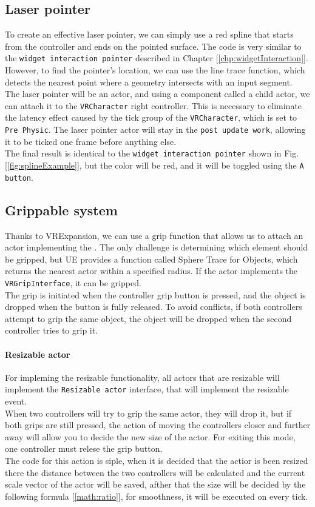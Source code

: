 \subsection{Laser pointer}
\noindent
To create an effective laser pointer, we can simply use a red spline that starts from the controller and ends on the pointed surface. The code is very similar to the \texttt{widget interaction pointer} described in Chapter [\ref{chp:widgetInteraction}]. However, to find the pointer's location, we can use the line trace function, which detects the nearest point where a geometry intersects with an input segment.\\
The laser pointer will be an actor, and using a component called a child actor, we can attach it to the \texttt{VRCharacter} right controller. This is necessary to eliminate the latency effect caused by the tick group of the \texttt{VRCharacter}, which is set to \texttt{Pre Physic}. The laser pointer actor will stay in the \texttt{post update work}, allowing it to be ticked one frame before anything else.\\
The final result is identical to the \texttt{widget interaction pointer} shown in Fig.[\ref{fig:splineExample}], but the color will be red, and it will be toggled using the \texttt{A button}.

\subsection{Grippable system}
\noindent
Thanks to VRExpansion, we can use a grip function that allows us to attach an actor implementing the .
The only challenge is determining which element should be gripped, but \ac{UE} provides a function called Sphere Trace for Objects, which returns the nearest actor within a specified radius.
If the actor implements the \texttt{VRGripInterface}, it can be gripped.\\
The grip is initiated when the controller grip button is pressed, and the object is dropped when the button is fully released.
To avoid conflicts, if both controllers attempt to grip the same object, the object will be dropped when the second controller tries to grip it.

\paragraph{Resizable actor}
For impleming the resizable functionality, all actors that are resizable will implement the \texttt{Resizable actor} interface, that will implement the resizable event.\\
When two controllers will try to grip the same actor, they will drop it, but if both grips are still pressed, the action of moving the controllers closer and further away will allow you to decide the new size of the actor.
For exiting this mode, one controller must relese the grip button.\\
The code for this action is siple, when it is decided that the actior is been resized there the distance between the two controllers will be calculated and the current scale vector of the actor will be saved, afther that the size will be decided by the following formula [\ref{math:ratio}], for smoothness, it will be executed on every tick.

